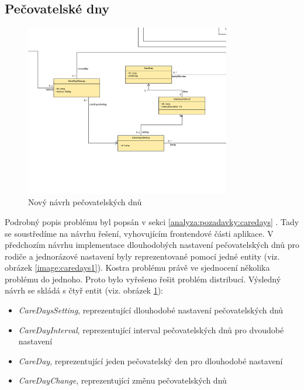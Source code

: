     \subsection{Pečovatelské dny}\label{navrh:upravy:caredays} %
        \begin{figure}\centering
	       \includegraphics[width=0.8\textwidth]{pdfs/CareDays2}
	       \caption[Nový návrh pečovatelských dnů]{Nový návrh pečovatelských dnů}\label{image:caredays2}
        \end{figure}
        Podrobný popis problému byl popsán v sekci \ref{analyza:pozadavky:caredays} . Tady se soustředíme na návrhu řešení, vyhovujícím frontendové části aplikace. V předchozím návrhu implementace dlouhodobých nastavení pečovatelských dnů pro rodiče a jednorázové nastavení byly reprezentované pomocí jedné entity (viz. obrázek \ref{image:caredays1}). Kostra problému právě ve sjednocení několika problému do jednoho. Proto bylo vyřešeno řešit problém distribucí. Výsledný návrh se skládá s čtyř entit (viz. obrázek \ref{image:caredays2}):
        \begin{itemize}
            \item \textit{CareDaysSetting}, reprezentující dlouhodobé nastavení pečovatelských dnů
            \item \textit{CareDayInterval}, reprezentující interval pečovatelských dnů pro dvoudobé nastavení
            \item \textit{CareDay}, reprezentující jeden pečovatelský den pro dlouhodobé nastavení
            \item \textit{CareDayChange}, reprezentující změnu pečovatelských dnů
        \end{itemize}
            
